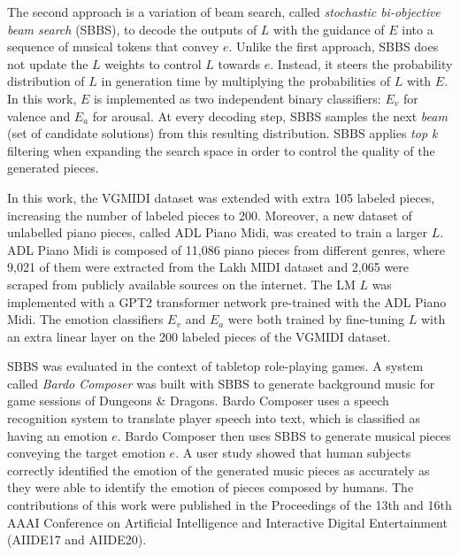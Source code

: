 The second approach is a variation of beam search, called \textit{stochastic bi-objective beam search} (SBBS), to decode the outputs of $L$ with the guidance of $E$ into a sequence of musical tokens that convey $e$. Unlike the first approach, SBBS does not update the $L$ weights to control $L$ towards $e$. Instead, it steers the probability distribution of $L$ in generation time by multiplying the probabilities of $L$ with $E$. In this work, $E$ is implemented as two independent binary classifiers: $E_v$ for valence and $E_a$ for arousal. At every decoding step, SBBS samples the next \textit{beam} (set of candidate solutions) from this resulting distribution. SBBS applies \textit{top k} filtering when expanding the search space in order to control the quality of the generated pieces.

In this work, the VGMIDI dataset was extended with extra 105 labeled pieces, increasing the number of labeled pieces to 200. Moreover, a new dataset of unlabelled piano pieces, called ADL Piano Midi, was created to train a larger $L$. ADL Piano Midi is composed of 11,086 piano pieces from different genres, where 9,021 of them were extracted from the Lakh MIDI dataset \cite{raffel2016learning} and 2,065 were scraped from publicly available sources on the internet. The LM $L$ was implemented with a GPT2 \cite{radford2019language} transformer network pre-trained with the ADL Piano Midi. The emotion classifiers $E_v$ and $E_a$ were both trained by fine-tuning $L$ with an extra linear layer on the 200 labeled pieces of the VGMIDI dataset.

SBBS was evaluated in the context of tabletop role-playing games. A system called \textit{Bardo Composer} was built with SBBS to generate background music for game sessions of Dungeons \& Dragons. Bardo Composer uses a speech recognition system to translate player speech into text, which is classified as having an emotion $e$. Bardo Composer then uses SBBS to generate musical pieces conveying the target emotion $e$. A user study showed that human subjects correctly identified the emotion of the generated music pieces as accurately as they were able to identify the emotion of pieces composed by humans. The contributions of this work were published in the Proceedings of the 13th \cite{padovani2017bardo} and 16th \cite{ferreira2020computer} AAAI Conference on Artificial Intelligence and Interactive Digital Entertainment (AIIDE17 and AIIDE20).


